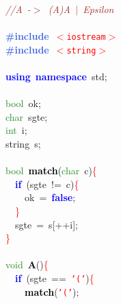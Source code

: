 
{\ttfamily \raggedright {
\noindent
\mbox{}\textit{\textcolor{Brown}{//A\ -$>$\ (A)A\ $|$\ Epsilon}} \\
\mbox{} \\
\mbox{}\textbf{\textcolor{RoyalBlue}{\#include}}\ \texttt{\textcolor{Red}{$<$iostream$>$}} \\
\mbox{}\textbf{\textcolor{RoyalBlue}{\#include}}\ \texttt{\textcolor{Red}{$<$string$>$}} \\
\mbox{} \\
\mbox{}\textbf{\textcolor{Blue}{using}}\ \textbf{\textcolor{Blue}{namespace}}\ std\textcolor{BrickRed}{;} \\
\mbox{} \\
\mbox{}\textcolor{ForestGreen}{bool}\ ok\textcolor{BrickRed}{;} \\
\mbox{}\textcolor{ForestGreen}{char}\ sgte\textcolor{BrickRed}{;} \\
\mbox{}\textcolor{ForestGreen}{int}\ i\textcolor{BrickRed}{;} \\
\mbox{}string\ s\textcolor{BrickRed}{;} \\
\mbox{} \\
\mbox{}\textcolor{ForestGreen}{bool}\ \textbf{\textcolor{Black}{match}}\textcolor{BrickRed}{(}\textcolor{ForestGreen}{char}\ c\textcolor{BrickRed}{)}\textcolor{Red}{\{} \\
\mbox{}\ \ \textbf{\textcolor{Blue}{if}}\ \textcolor{BrickRed}{(}sgte\ \textcolor{BrickRed}{!=}\ c\textcolor{BrickRed}{)}\textcolor{Red}{\{} \\
\mbox{}\ \ \ \ ok\ \textcolor{BrickRed}{=}\ \textbf{\textcolor{Blue}{false}}\textcolor{BrickRed}{;} \\
\mbox{}\ \ \textcolor{Red}{\}} \\
\mbox{}\ \ sgte\ \textcolor{BrickRed}{=}\ s\textcolor{BrickRed}{[++}i\textcolor{BrickRed}{];} \\
\mbox{}\textcolor{Red}{\}} \\
\mbox{} \\
\mbox{}\textcolor{ForestGreen}{void}\ \textbf{\textcolor{Black}{A}}\textcolor{BrickRed}{()}\textcolor{Red}{\{} \\
\mbox{}\ \ \textbf{\textcolor{Blue}{if}}\ \textcolor{BrickRed}{(}sgte\ \textcolor{BrickRed}{==}\ \texttt{\textcolor{Red}{'('}}\textcolor{BrickRed}{)}\textcolor{Red}{\{} \\
\mbox{}\ \ \ \ \textbf{\textcolor{Black}{match}}\textcolor{BrickRed}{(}\texttt{\textcolor{Red}{'('}}\textcolor{BrickRed}{);} \\
}}

